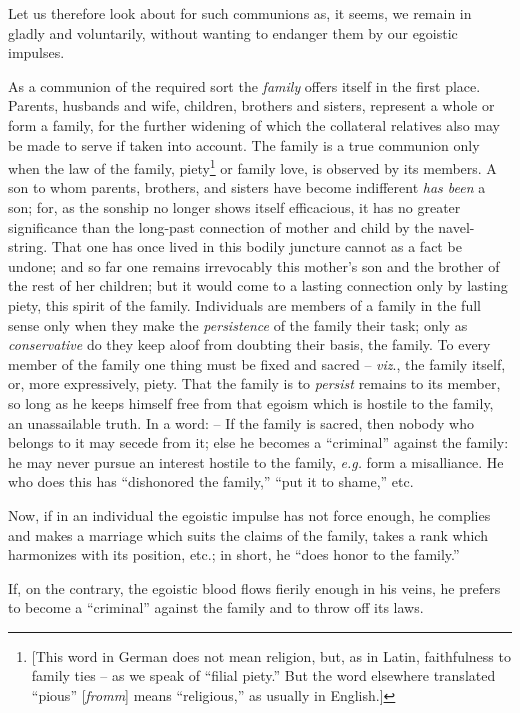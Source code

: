 \documentclass[12pt,a4paper]{book}
\begin{document}
Let us therefore look about for such communions as, it seems, we remain in 
gladly and voluntarily, without wanting to endanger them by our egoistic 
impulses.

As a communion of the required sort the \textit{family} offers itself in the 
first place. Parents, husbands and wife, children, brothers and sisters, 
represent a whole or form a family, for the further widening of which the 
collateral relatives also may be made to serve if taken into account. The 
family is a true communion only when the law of the family, 
piety\footnote{[This word in German does not mean religion, but, as in Latin, 
faithfulness to family ties -- as we speak of ``filial piety.'' But the word 
elsewhere translated ``pious'' [\textit{fromm}] means ``religious,'' as 
usually in English.]} or family love, is observed by its members. A son to 
whom parents, brothers, and sisters have become indifferent \textit{has been} 
a son; for, as the sonship no longer shows itself efficacious, it has no 
greater significance than the long-past connection of mother and child by the 
navel-string. That one has once lived in this bodily juncture cannot as a fact 
be undone; and so far one remains irrevocably this mother's son and the 
brother of the rest of her children; but it would come to a lasting connection 
only by lasting piety, this spirit of the family. Individuals are members of a 
family in the full sense only when they make the \textit{persistence} of the 
family their task; only as \textit{conservative} do they keep aloof from 
doubting their basis, the family. To every member of the family one thing must 
be fixed and sacred -- \textit{viz}., the family itself, or, more 
expressively, piety. That the family is to \textit{persist} remains to its 
member, so long as he keeps himself free from that egoism which is hostile to 
the family, an unassailable truth. In a word: -- If the family is sacred, then 
nobody who belongs to it may secede from it; else he becomes a ``criminal'' 
against the family: he may never pursue an interest hostile to the family, 
\textit{e.g.} form a misalliance. He who does this has ``dishonored the 
family,'' ``put it to shame,'' etc.

Now, if in an individual the egoistic impulse has not force enough, he 
complies and makes a marriage which suits the claims of the family, takes a 
rank which harmonizes with its position, etc.; in short, he ``does honor to 
the family.''

If, on the contrary, the egoistic blood flows fierily enough in his veins, he 
prefers to become a ``criminal'' against the family and to throw off its 
laws.
\end{document}
